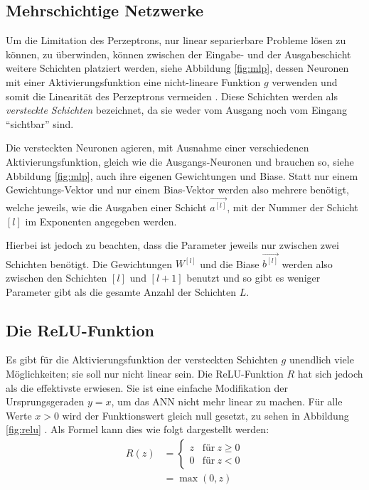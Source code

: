 \documentclass[12pt,titlepage]{article}
\begin{document}
\subsection{Mehrschichtige Netzwerke}

Um die Limitation des Perzeptrons, nur linear separierbare Probleme lösen zu können, zu überwinden, können zwischen der Eingabe- und der Ausgabeschicht weitere Schichten platziert werden, siehe Abbildung \ref{fig:mlp}, dessen Neuronen mit einer Aktivierungsfunktion eine nicht-lineare Funktion \(g\) verwenden und somit die Linearität des Perzeptrons vermeiden \autocite[18]{abdiNeuralNetworkPrimer1994}. Diese Schichten werden als \textit{versteckte Schichten} bezeichnet, da sie weder vom Ausgang noch vom Eingang \enquote{sichtbar} sind.

Die versteckten Neuronen agieren, mit Ausnahme einer verschiedenen Aktivierungsfunktion, gleich wie die Ausgangs-Neuronen und brauchen so, siehe Abbildung \ref{fig:mlp}, auch ihre eigenen Gewichtungen und Biase. Statt nur einem Gewichtungs-Vektor und nur einem Bias-Vektor werden also mehrere benötigt, welche jeweils, wie die Ausgaben einer Schicht \(\vec{a^{[l]}}\), mit der Nummer der Schicht \([l]\) im Exponenten angegeben werden.

Hierbei ist jedoch zu beachten, dass die Parameter jeweils nur zwischen zwei Schichten benötigt. Die Gewichtungen \(W^{[l]}\) und die Biase \(\vec{b^{[l]}}\) werden also zwischen den Schichten \([l]\) und \([l+1]\) benutzt und so gibt es weniger Parameter gibt als die gesamte Anzahl der Schichten \(L\).

\subsection{Die ReLU-Funktion}

Es gibt für die Aktivierungsfunktion der versteckten Schichten \(g\) unendlich viele Möglichkeiten; sie soll nur nicht linear sein. Die ReLU-Funktion $R$ hat sich jedoch als die effektivste erwiesen. Sie ist eine einfache Modifikation der Ursprungsgeraden $y=x$, um das ANN nicht mehr linear zu machen. Für alle Werte $x > 0$ wird der Funktionswert gleich null gesetzt, zu sehen in Abbildung \ref{fig:relu} \autocite{sharmaActivationFunctionsNeural2022}. Als Formel kann dies wie folgt dargestellt werden:
\begin{align*}
  R(z) & = \begin{cases}
             z & \text{für} \ z \geq 0 \\
             0 & \text{für} \ z < 0
           \end{cases} \\
       & = \max(0, z)
\end{align*}
\end{document}
